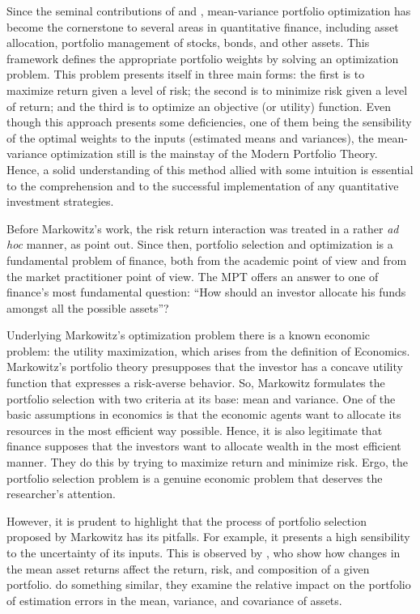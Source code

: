 \documentclass[12pt,oneside,a4paper]{memoir}
\begin{document}
Since the seminal contributions of  and , mean-variance portfolio optimization has become the cornerstone to several areas in quantitative finance, including asset allocation, portfolio management of stocks, bonds, and other assets.
This framework defines the appropriate portfolio weights by solving an optimization problem.
This problem presents itself in three main forms:
the first is to maximize return given a level of risk;
the second is to minimize risk given a level of return; and
the third is to optimize an objective (or utility) function.
Even though this approach presents some deficiencies, one of them being the sensibility of the optimal weights to the inputs (estimated means and variances), the mean-variance optimization still is the mainstay of the Modern Portfolio Theory.
Hence, a solid understanding of this method allied with some intuition is essential to the comprehension and to the successful implementation of any quantitative investment strategies.

Before Markowitz's work, the risk return interaction was treated in a rather \textit{ad hoc} manner, as  point out.
Since then, portfolio selection and optimization is a fundamental problem of finance, both from the academic point of view and from the market practitioner point of view.
The MPT offers an answer to one of finance's most fundamental question: ``How should an investor allocate his funds amongst all the possible assets''?

Underlying Markowitz's optimization problem there is a known economic problem: the utility maximization, which arises from the definition of Economics. 
Markowitz's portfolio theory presupposes that the investor has a concave utility function that expresses a risk-averse behavior.
So, Markowitz formulates the portfolio selection with two criteria at its base: mean and variance.
One of the basic assumptions in economics is that the economic agents want to allocate its resources in the most efficient way possible.
Hence, it is also legitimate that finance supposes that the investors want to allocate wealth in the most efficient manner.
They do this by trying to maximize return and minimize risk.
Ergo, the portfolio selection problem is a genuine economic problem that deserves the researcher's attention.

However, it is prudent to highlight that the process of portfolio selection proposed by Markowitz has its pitfalls.
For example, it presents a high sensibility to the uncertainty of its inputs.
This is observed by , who show how changes in the mean asset returns affect the return, risk, and composition of a given portfolio.
 do something similar, they examine the relative impact on the portfolio of estimation errors in the mean, variance, and covariance of assets.
\end{document}
